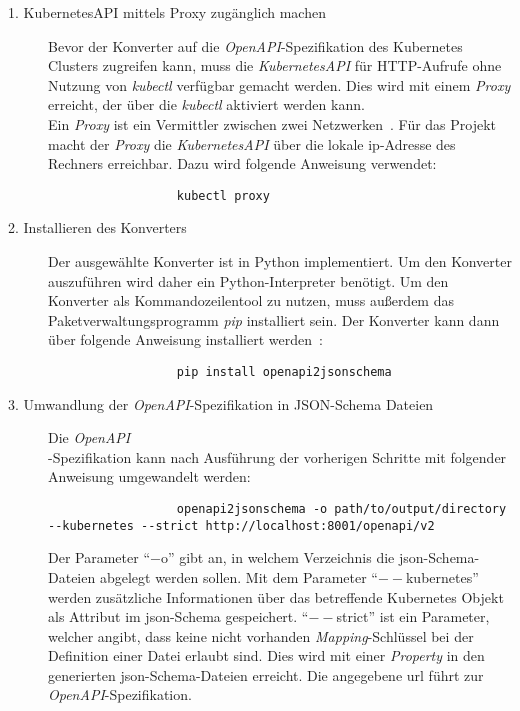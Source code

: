 \begin{description}
  \item[1. KubernetesAPI mittels Proxy zugänglich machen]
        Bevor der Konverter auf die \textit{OpenAPI}-Spezifikation des Kubernetes Clusters zugreifen kann, muss die \textit{KubernetesAPI}
        für HTTP-Aufrufe ohne Nutzung von \textit{kubectl} verfügbar gemacht werden. Dies wird mit einem \textit{Proxy} erreicht, der über die \textit{kubectl}
        aktiviert werden kann. \\
        Ein \textit{Proxy} ist ein Vermittler zwischen zwei Netzwerken~\cite{proxy-ryte-wiki,proxy-it-service-network}.
        Für das Projekt macht der \textit{Proxy} die \textit{KubernetesAPI} über die lokale \acs{ip}-Adresse des Rechners erreichbar.
        Dazu wird folgende Anweisung verwendet:
        \begin{verbatim}
                  kubectl proxy
            \end{verbatim}
  \item[2. Installieren des Konverters]
        Der ausgewählte Konverter ist in Python implementiert. Um den Konverter auszuführen wird daher ein Python-Interpreter benötigt.
        Um den Konverter als Kommandozeilentool zu nutzen, muss außerdem das Paketverwaltungsprogramm \textit{pip} installiert sein.
        Der Konverter kann dann über folgende Anweisung installiert werden~\cite{openapi-to-json-schema}:
        \begin{verbatim}
                  pip install openapi2jsonschema
            \end{verbatim}
  \item[3. Umwandlung der \textit{OpenAPI}-Spezifikation in JSON-Schema Dateien]
        Die \textit{OpenAPI}\\-Spezifikation kann nach Ausführung der vorherigen Schritte mit folgender Anweisung umgewandelt werden:
        \begin{verbatim}
                  openapi2jsonschema -o path/to/output/directory --kubernetes --strict http://localhost:8001/openapi/v2
            \end{verbatim}
        Der Parameter ``$-$o'' gibt an, in welchem Verzeichnis die \ac{json}-Schema-Dateien abgelegt werden sollen.
        Mit dem Parameter ``$--$kubernetes'' werden zusätzliche Informationen über das betreffende Kubernetes Objekt als Attribut im \ac{json}-Schema gespeichert.
        ``$--$strict'' ist ein Parameter, welcher angibt, dass keine nicht vorhanden \textit{Mapping}-Schlüssel bei der Definition einer Datei erlaubt sind.
        Dies wird mit einer \textit{Property} in den generierten \ac{json}-Schema-Dateien erreicht.
        Die angegebene \ac{url} führt zur \textit{OpenAPI}-Spezifikation.
\end{description}

